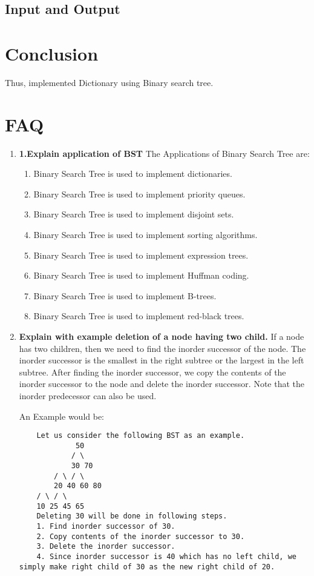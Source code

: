 \documentclass[11pt]{article}
\begin{document}
\subsection{Input and Output}


\section{Conclusion}
Thus, implemented Dictionary using Binary search tree.
\clearpage

\section{FAQ}
\begin{enumerate}
	\item \textbf{1.Explain application of BST}
	      The Applications of Binary Search Tree are:
	      \begin{enumerate}
		      \item Binary Search Tree is used to implement dictionaries.
		      \item Binary Search Tree is used to implement priority queues.
		      \item Binary Search Tree is used to implement disjoint sets.
		      \item Binary Search Tree is used to implement sorting algorithms.
		      \item Binary Search Tree is used to implement expression trees.
		      \item Binary Search Tree is used to implement Huffman coding.
		      \item Binary Search Tree is used to implement B-trees.
		      \item Binary Search Tree is used to implement red-black trees.
	      \end{enumerate}
	\item \textbf{Explain with example deletion of a node having two child.}
	      If a node has two children, then we need to find the inorder successor of the node. The inorder successor is the smallest in the right subtree or the largest in the left subtree. After finding the inorder successor, we copy the contents of the inorder successor to the node and delete the inorder successor. Note that the inorder predecessor can also be used.

	      An Example would be:
	      \begin{verbatim}
    Let us consider the following BST as an example.
             50
            / \
            30 70
        / \ / \
        20 40 60 80
    / \ / \
    10 25 45 65
    Deleting 30 will be done in following steps.
    1. Find inorder successor of 30.
    2. Copy contents of the inorder successor to 30.
    3. Delete the inorder successor.
    4. Since inorder successor is 40 which has no left child, we simply make right child of 30 as the new right child of 20.
    


\end{verbatim}
\end{enumerate}
\end{document}
